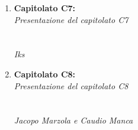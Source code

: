 \documentclass[StudioDiFattibilità.tex]{subfiles}
\begin{document}
\begin{enumerate}
	\item \textbf{Capitolato C7:}\\
		\textit{Presentazione del capitolato C7}\\
		\\\\
		\textit{Iks} 
		
	\item \textbf{Capitolato C8:}\\
		\textit{Presentazione del capitolato C8}\\
		\\\\
		\textit{Jacopo Marzola e Caudio Manca}
		
		
\end{enumerate}
	
\end{document}
